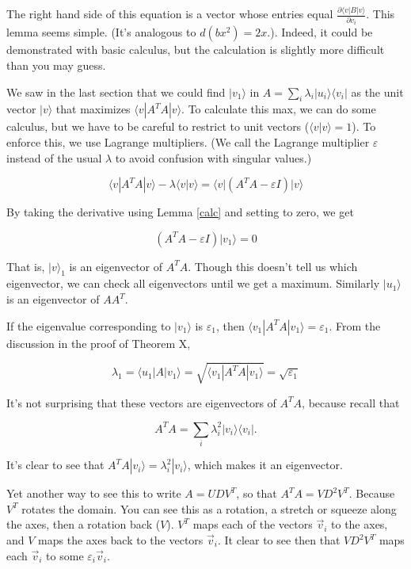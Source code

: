 \documentclass{amsbook}
\begin{document}
The right hand side of this equation is a vector whose entries equal $\frac{\partial\langle v|B|v\rangle}{\partial v_i}$.  This lemma seems simple.  (It's analogous to $d(bx^2)=2x$.). Indeed, it could be demonstrated with basic calculus, but the calculation is slightly more difficult than you may guess.

We saw in the last section that we could find $|v_1\rangle$ in $A=\sum_i\lambda_i|u_i\rangle\langle v_i|$ as the unit vector $|v\rangle$ that maximizes $\langle v|A^TA|v\rangle$.  To calculate this max, we can do some calculus, but we have to be careful to restrict to unit vectors ($\langle v|v\rangle=1$).  To enforce this, we use Lagrange multipliers.  (We call the Lagrange multiplier $\varepsilon$ instead of the usual $\lambda$ to avoid confusion with singular values.)

$$
\langle v|A^TA|v\rangle-\lambda\langle v|v\rangle=\langle v|\left(A^TA-\varepsilon I\right)|v\rangle
$$

By taking the derivative using Lemma \ref{calc} and setting to zero, we get

$$
\left(A^TA-\varepsilon I\right)|v_1\rangle=0
$$

That is, $|v\rangle_1$ is an eigenvector of $A^TA$.  Though this doesn't tell us which eigenvector, we can check all eigenvectors until we get a maximum.  Similarly $|u_1\rangle$ is an eigenvector of $AA^T$.

If the eigenvalue corresponding to $|v_1\rangle$ is $\varepsilon_1$, then $\langle v_1|A^TA|v_1\rangle=\varepsilon_1$.  From the discussion in the proof of Theorem X,

$$
\lambda_1=\langle u_1|A|v_1\rangle=\sqrt{\langle v_1|A^TA|v_1\rangle}=\sqrt{\varepsilon_1}
$$

It's not surprising that these vectors are eigenvectors of $A^TA$, because recall that 

$$
A^TA=\sum_i\lambda_i^2|v_i\rangle\langle v_i|.
$$

It's clear to see that $A^TA|v_i\rangle=\lambda_i^2|v_i\rangle$, which makes it an eigenvector.

Yet another way to see this to write $A=UDV^T$, so that $A^TA=VD^2V^T$.  Because $V^T$ rotates the domain.  You can see this as a rotation, a stretch or squeeze along the axes, then a rotation back ($V$).  $V^T$ maps each of the vectors $\vec v_i$ to the axes, and $V$ maps the axes back to the vectors $\vec v_i$.  It clear to see then that $VD^2V^T$ maps each $\vec v_i$ to some $\varepsilon_i\vec v_i$.
\end{document}
